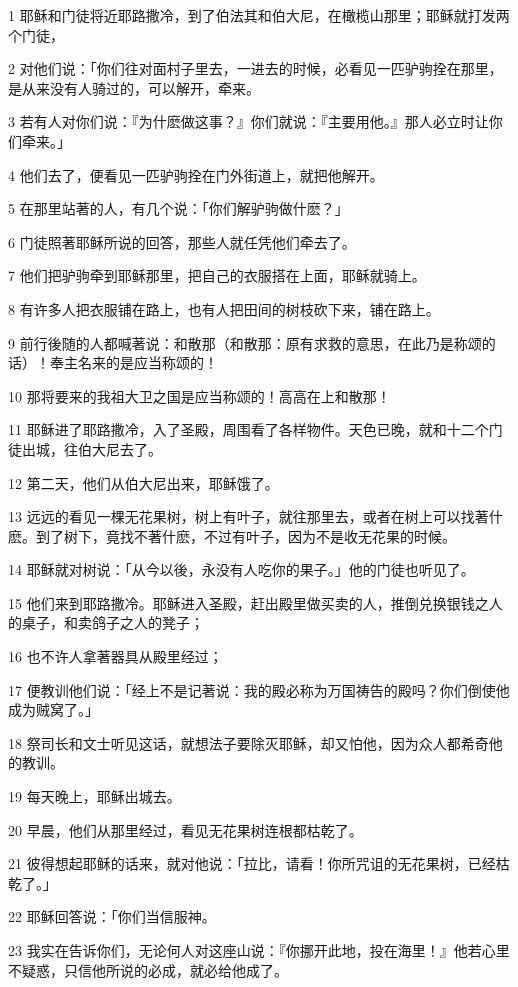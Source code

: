 \par 1 耶稣和门徒将近耶路撒冷，到了伯法其和伯大尼，在橄榄山那里；耶稣就打发两个门徒，
\par 2 对他们说：「你们往对面村子里去，一进去的时候，必看见一匹驴驹拴在那里，是从来没有人骑过的，可以解开，牵来。
\par 3 若有人对你们说：『为什麽做这事？』你们就说：『主要用他。』那人必立时让你们牵来。」
\par 4 他们去了，便看见一匹驴驹拴在门外街道上，就把他解开。
\par 5 在那里站著的人，有几个说：「你们解驴驹做什麽？」
\par 6 门徒照著耶稣所说的回答，那些人就任凭他们牵去了。
\par 7 他们把驴驹牵到耶稣那里，把自己的衣服搭在上面，耶稣就骑上。
\par 8 有许多人把衣服铺在路上，也有人把田间的树枝砍下来，铺在路上。
\par 9 前行後随的人都喊著说：和散那（和散那：原有求救的意思，在此乃是称颂的话）！奉主名来的是应当称颂的！
\par 10 那将要来的我祖大卫之国是应当称颂的！高高在上和散那！
\par 11 耶稣进了耶路撒冷，入了圣殿，周围看了各样物件。天色已晚，就和十二个门徒出城，往伯大尼去了。
\par 12 第二天，他们从伯大尼出来，耶稣饿了。
\par 13 远远的看见一棵无花果树，树上有叶子，就往那里去，或者在树上可以找著什麽。到了树下，竟找不著什麽，不过有叶子，因为不是收无花果的时候。
\par 14 耶稣就对树说：「从今以後，永没有人吃你的果子。」他的门徒也听见了。
\par 15 他们来到耶路撒冷。耶稣进入圣殿，赶出殿里做买卖的人，推倒兑换银钱之人的桌子，和卖鸽子之人的凳子；
\par 16 也不许人拿著器具从殿里经过；
\par 17 便教训他们说：「经上不是记著说：我的殿必称为万国祷告的殿吗？你们倒使他成为贼窝了。」
\par 18 祭司长和文士听见这话，就想法子要除灭耶稣，却又怕他，因为众人都希奇他的教训。
\par 19 每天晚上，耶稣出城去。
\par 20 早晨，他们从那里经过，看见无花果树连根都枯乾了。
\par 21 彼得想起耶稣的话来，就对他说：「拉比，请看！你所咒诅的无花果树，已经枯乾了。」
\par 22 耶稣回答说：「你们当信服神。
\par 23 我实在告诉你们，无论何人对这座山说：『你挪开此地，投在海里！』他若心里不疑惑，只信他所说的必成，就必给他成了。
